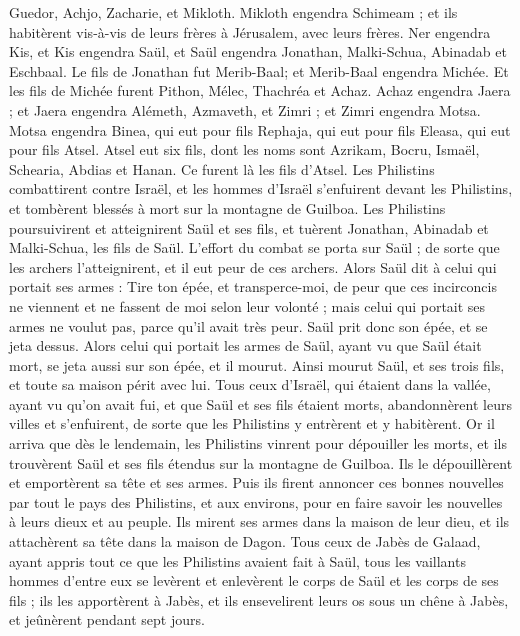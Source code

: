 \begin{multicols}{2}
Guedor, Achjo, Zacharie, et Mikloth.
Mikloth engendra Schimeam ; et ils habitèrent vis-à-vis de leurs frères à Jérusalem, avec leurs frères.
Ner engendra Kis, et Kis engendra Saül, et Saül engendra Jonathan, Malki-Schua, Abinadab et Eschbaal.
Le fils de Jonathan fut  Merib-Baal; et Merib-Baal engendra Michée.
Et les fils de Michée furent Pithon, Mélec, Thachréa et Achaz.
Achaz engendra Jaera ; et Jaera engendra Alémeth, Azmaveth, et Zimri ; et Zimri engendra Motsa.
Motsa engendra Binea, qui eut pour fils Rephaja, qui eut pour fils Eleasa, qui eut pour fils Atsel.
Atsel eut six fils, dont les noms sont Azrikam, Bocru, Ismaël, Schearia, Abdias et Hanan. Ce furent là les fils d'Atsel.
\VerseOne{}Les Philistins combattirent contre Israël, et les hommes d'Israël s'enfuirent devant les Philistins, et tombèrent blessés à mort sur la montagne de Guilboa.
Les Philistins poursuivirent et atteignirent Saül et ses fils, et tuèrent Jonathan, Abinadab et Malki-Schua, les fils de Saül.
L’effort du combat se porta sur Saül ; de sorte que les archers l'atteignirent, et il eut peur de ces archers.
Alors Saül dit à celui qui portait ses armes : Tire ton épée, et transperce-moi, de peur que ces incirconcis ne viennent et ne fassent de moi selon leur volonté ; mais celui qui portait ses armes ne voulut pas, parce qu’il avait très peur. Saül prit donc son épée, et se jeta dessus.
Alors celui qui portait les armes de Saül, ayant vu que Saül était mort, se jeta aussi sur son épée, et il mourut.
Ainsi mourut Saül, et ses trois fils, et toute sa maison périt avec lui.
Tous ceux d'Israël, qui étaient dans la vallée, ayant vu qu'on avait fui, et que Saül et ses fils étaient morts, abandonnèrent leurs villes et s'enfuirent, de sorte que les Philistins y entrèrent et y habitèrent.
Or il arriva que dès le lendemain, les Philistins vinrent pour dépouiller les morts, et ils trouvèrent Saül et ses fils étendus sur la montagne de Guilboa.
Ils le dépouillèrent et emportèrent sa tête et ses armes. Puis ils firent annoncer ces bonnes nouvelles par tout le pays des Philistins, et aux environs, pour en faire savoir les nouvelles à leurs dieux et au peuple.
Ils mirent ses armes dans la maison de leur dieu, et ils attachèrent sa tête dans la maison de Dagon.
Tous ceux de Jabès de Galaad, ayant appris tout ce que les Philistins avaient fait à Saül,
tous les vaillants hommes d’entre eux se levèrent et enlevèrent le corps de Saül et les corps de ses fils ; ils les apportèrent à Jabès, et ils ensevelirent leurs os sous un chêne à Jabès, et jeûnèrent pendant sept jours.

\end{multicols}
